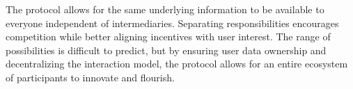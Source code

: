 \documentclass[12pt,letterpaper]{article}
\begin{document}
The protocol allows for the same underlying information to be available to everyone
independent of intermediaries. Separating responsibilities encourages competition while
better aligning incentives with user interest. The range of possibilities is difficult to
predict, but by ensuring user data ownership and decentralizing the interaction model, the
protocol allows for an entire ecosystem of participants to innovate and flourish.

\nocite{0xwhitepaper}
\nocite{al-dahhan2019}
\nocite{al-dahhan2019}
\nocite{ateniese2006a}
\nocite{bünz2020}
\nocite{cheng2020}
\nocite{diebold2017}
\nocite{eip1078}
\nocite{eip173}
\nocite{eip712}
\nocite{ethereumyellow}
\nocite{ge2019}
\nocite{gnosissafe}
\nocite{green2018}
\nocite{henry2018}
\nocite{json-web-encryption}
\nocite{nacl}
\nocite{nakamoto}
\nocite{omara2020}
\nocite{openzeppelin}
\nocite{pirk}
\nocite{raikwar2019}
\nocite{swarm}
\nocite{ugander2011}
\nocite{unilogin}
\nocite{whisper}
\nocite{williams2019}

\printbibliography


\clearpage
\end{document}
